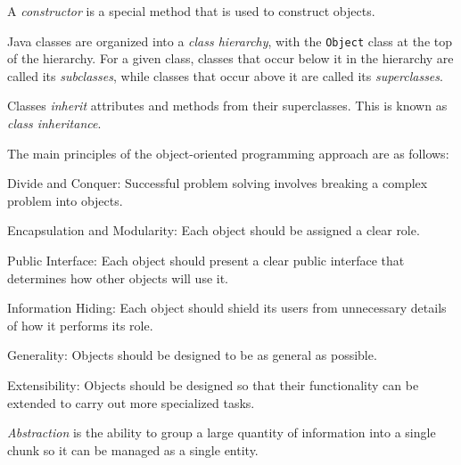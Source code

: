 \begin{SMBL}
\item A {\em constructor} is a special method that is used to
construct objects.

\item Java classes are organized into a {\em class hierarchy}, with the
{\tt Object} class at the top of the hierarchy. For a given class, classes
that occur below it in the hierarchy are called its {\em subclasses},
while classes that occur above it are called its {\em superclasses}.

\item Classes {\em inherit} attributes and methods from their superclasses.
This is known as {\em class inheritance}.

\item The main principles of the object-oriented programming approach
are as follows:

\begin{SMBSE}
\item Divide and Conquer: Successful problem solving involves breaking
a complex problem into objects.

\item Encapsulation and Modularity: Each object should be assigned a
clear role.

\item Public Interface: Each object should present a clear public
interface that determines how other objects will use it.

\item Information Hiding: Each object should shield its users from
unnecessary details of how it performs its role.

\item Generality: Objects should be designed to be as general as
possible.

\item Extensibility: Objects should be designed so that their
functionality can be extended to carry out more specialized tasks.

\item {\it Abstraction} is the ability to group a large quantity of
information into a single chunk so it can be managed as a single
entity.  

\end{SMBSE}
\end{SMBL}

